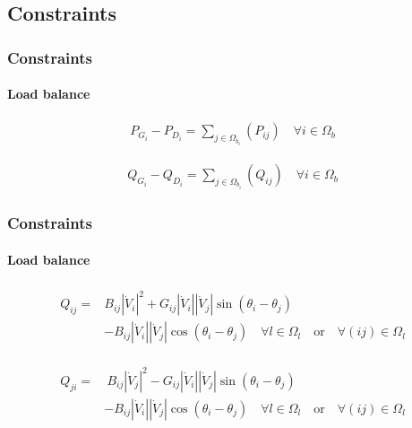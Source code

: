 \documentclass[
	11pt, %
	aspectratio=169, %
]{beamer}
\begin{document}

\subsection{Constraints}

\begin{frame}
	\frametitle{Constraints}
	\label{frame:constraints}
	\framesubtitle{Load balance} %

	\begin{align}
	\label{eq:cons_load_bal_P}
		P_{G_{i}} - P_{D_{i}} = \sum_{j \in \Omega_{b_{i}}}(P_{ij})  \quad \forall i \in \Omega_{b}
	\end{align}

	\begin{align}
	\label{eq:cons_load_bal_Q}
		Q_{G_{i}} - Q_{D_{i}} = \sum_{j \in \Omega_{b_{i}}}(Q_{ij})  \quad \forall i \in \Omega_{b}
	\end{align}
	
\end{frame}


\begin{frame}
	\frametitle{Constraints}
	\framesubtitle{Load balance} %


	\begin{align}
	\label{eq:expr_q_flow_ij}
		\begin{split}
			Q_{ij}=&B_{ij}\left\lvert \dot{V}_{i}\right\rvert^{2} + G_{ij}\left\lvert \dot{V}_{i}\right\rvert\left\lvert \dot{V}_{j}\right\rvert \sin{\left(\theta_{i}-\theta_{j}\right)} \\
			&- B_{ij}\left\lvert \dot{V}_{i}\right\rvert\left\lvert \dot{V}_{j}\right\rvert \cos{\left(\theta_{i}-\theta_{j}\right)}  \quad   \forall l \in \Omega_{l} \quad \text{or} \quad \forall (ij) \in \Omega_{l}
		\end{split}
	\end{align}

	\begin{align}
	\label{eq:expr_q_flow_ji}
		\begin{split}
			Q_{ji} =&\ B_{ij}\left\lvert \dot{V}_{j}\right\rvert^{2} - G_{ij}\left\lvert \dot{V}_{i}\right\rvert\left\lvert \dot{V}_{j}\right\rvert \sin{\left(\theta_{i}-\theta_{j}\right)} \\
			&- B_{ij}\left\lvert \dot{V}_{i}\right\rvert\left\lvert \dot{V}_{j}\right\rvert \cos{\left(\theta_{i}-\theta_{j}\right)}  \quad   \forall l \in \Omega_{l} \quad \text{or} \quad \forall (ij) \in \Omega_{l}
		\end{split}
	\end{align}

	
\end{frame}
\end{document}
